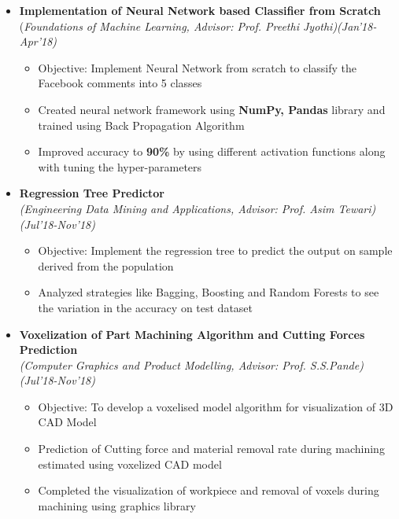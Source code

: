\documentclass[a4paper,10pt]{article}
\begin{document}
\begin{itemize}
\item \textbf{Implementation of Neural Network based Classifier from Scratch} \\ 
(\emph{Foundations of Machine Learning, Advisor: Prof. Preethi Jyothi)\hfill (Jan'18-Apr’18)} \\[-0.4cm]
	\begin{itemize}[noitemsep,nolistsep]
	\item Objective: Implement Neural Network from scratch to classify the Facebook comments into 5 classes %
    \item Created neural network framework using \textbf{NumPy, Pandas} library and trained using Back Propagation Algorithm
    \item Improved accuracy to \textbf{90\%} by using different activation functions along with tuning the hyper-parameters
	\end{itemize}
\newpage
\item \textbf{Regression Tree Predictor}\\
\emph{(Engineering Data Mining and Applications, Advisor: Prof. Asim Tewari)\hfill (Jul'18-Nov’18)} \\[-0.4cm]
	\begin{itemize}[noitemsep,nolistsep]
    \item Objective: Implement the regression tree to predict the output on sample derived from the population 
    \item Analyzed strategies like Bagging, Boosting and Random Forests to see the variation in the accuracy on test dataset
	\end{itemize}


\item \textbf{Voxelization of Part Machining Algorithm and Cutting Forces Prediction}\\
\emph{(Computer Graphics and Product Modelling, Advisor: Prof. S.S.Pande)\hfill (Jul'18-Nov’18)} \\[-0.4cm]
	\begin{itemize}[noitemsep,nolistsep]
    \item Objective: To develop a voxelised model algorithm for visualization of 3D CAD Model
    \item Prediction of Cutting force and material removal rate during machining estimated using voxelized CAD model
    \item Completed the visualization of workpiece and removal of voxels during machining using graphics library
	\end{itemize}
	

\end{itemize}
\end{document}
